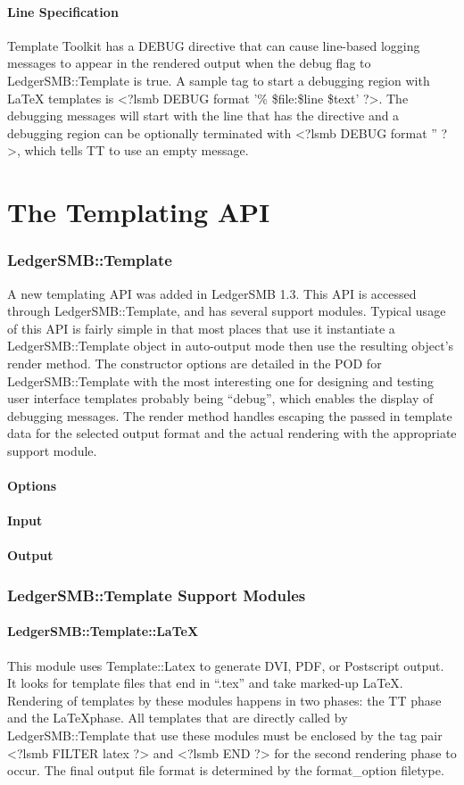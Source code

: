 \documentclass[english]{article}
\newcommand{\pitag}[1]{\textless?lsmb #1 ?\textgreater}
\newcommand{\lsmb}{LedgerSMB }
\newcommand{\lsmbt}{LedgerSMB::Template}
\begin{document}
\subsection{Line Specification}
Template Toolkit has a DEBUG directive that can cause line-based logging
messages to appear in the rendered output when the debug flag to \lsmbt{ }is
true.   A sample tag to start a debugging region with \LaTeX{ }templates is
\pitag{DEBUG format '\% \$file:\$line \$text'}.  The debugging messages will
start with the line that has the directive and a debugging region can be
optionally terminated with \pitag{DEBUG format ''}, which tells TT to use an
empty message.

\part{The Templating API}
\section{\lsmbt}
A new templating API was added in \lsmb 1.3.  This API is accessed through
\lsmbt, and has several support modules.  Typical usage of this API is fairly
simple in that most places that use it instantiate a \lsmbt{ }object in
auto-output mode then use the resulting object's render method.  The
constructor options are detailed in the POD for \lsmbt{ }with the most
interesting one for designing and testing user interface templates probably
being ``debug'', which enables the display of debugging messages.  The render
method handles escaping the passed in template data for the selected output
format and the actual rendering with the appropriate support module.

\subsection{Options}
\subsection{Input}
\subsection{Output}

\section{\lsmbt{ }Support Modules}
\subsection{\lsmbt::LaTeX}
This module uses Template::Latex to generate DVI, PDF, or Postscript output.
It looks for template files that end in ``.tex'' and take marked-up \LaTeX.
Rendering of templates by these modules happens in two phases: the TT phase
and the \LaTeX phase.  All templates that are directly called by \lsmbt{ }that
use these modules must be enclosed by the tag pair \pitag{FILTER latex} and
\pitag{END} for the second rendering phase to occur.  The final output file
format is determined by the format\_option filetype.
\end{document}
